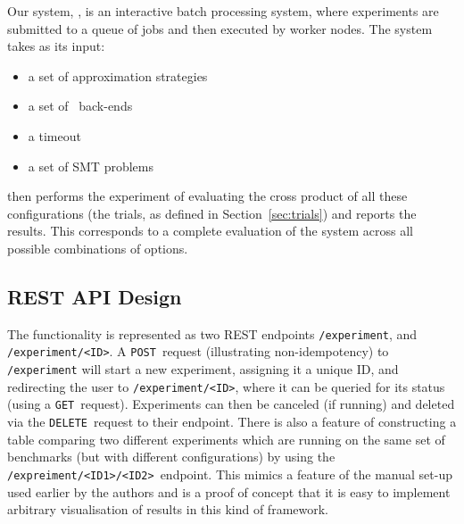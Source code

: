 \documentclass[a4paper]{IEEEtran}
\begin{document}
Our system, \testbench{}, is an interactive batch processing system,
where experiments are submitted to a queue of jobs and then executed
by worker nodes. The system takes as its input:
\begin{itemize}
  \item a set of approximation strategies
  \item a set of \uppsat{}\ back-ends
  \item a timeout
  \item a set of SMT problems
\end{itemize}
\testbench{} then performs the experiment of evaluating the cross product of all
these configurations (the trials, as defined in Section~\ref{sec:trials})
and reports the results. This corresponds to a complete evaluation of the system
across all possible combinations of options. 

\subsection{REST API Design}

The functionality is represented as two REST endpoints
\texttt{/experiment}, and \texttt{/experiment/<ID>}. A
\texttt{POST}~request (illustrating non-idempotency) to
\texttt{/experiment} will start a new experiment, assigning it a
unique ID, and redirecting the user to \texttt{/experiment/<ID>},
where it can be queried for its status (using a
\texttt{GET}~request). Experiments can then be canceled (if running)
and deleted via the \texttt{DELETE}~request to their endpoint. There
is also a feature of constructing a table comparing two different
experiments which are running on the same set of benchmarks (but with
different configurations) by using the
\texttt{/expreiment/<ID1>/<ID2>}~endpoint. This mimics a feature of
the manual set-up used earlier by the authors and is a proof of
concept that it is easy to implement arbitrary visualisation of
results in this kind of framework.
\end{document}
